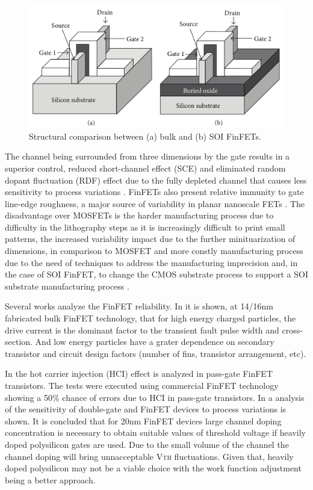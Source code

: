\documentclass[ecp,tc, english]{iiufrgs}
\begin{document}
\begin{figure}[H]
\centering
\includegraphics[width=\textwidth, trim={0 0cm 0 0cm},clip]{finfet2.png}
\caption{Structural comparison between (a) bulk and (b) SOI FinFETs.}
\label{bulkvssoi}
\end{figure}

The channel being surrounded from three dimensions by the gate results in a superior control, reduced short-channel effect (SCE) and eliminated random dopant fluctuation (RDF) effect due to the fully depleted channel that causes less sensitivity to process variations \cite{taur2013fundamentals}. FinFETs also present relative immunity to gate line-edge roughness, a major source of variability in planar nanoscale FETs \cite{finfetchar1}. The disadvantage over MOSFETs is the harder manufacturing process due to difficulty in the lithography steps as it is increasingly difficult to print small patterns, the increased variability impact due to the further minituarization of dimensions, in comparison to MOSFET and more constly manufacturing process due to the need of techniques to address the manufacturing imprecision and, in the case of SOI FinFET, to change the CMOS substrate process to support a SOI substrate manufacturing process \cite{finfetchar1} \cite{finfetdis}.

Several works analyze the FinFET reliability. In \cite{FinFET01} it is shown, at 14/16nm fabricated bulk FinFET technology, that for high energy charged particles, the drive current is the dominant factor to the transient fault pulse width and cross-section. And low energy particles have a grater dependence on secondary transistor and circuit design factors (number of fins, transistor arrangement, etc). 

In \cite{FinFET02} the hot carrier injection (HCI) effect is analyzed in pass-gate FinFET transistors. The tests were executed using commercial FinFET technology showing a 50\% chance of errors due to HCI in pass-gate transistors. In \cite{FinFET03} a analysis of the sensitivity of double-gate and FinFET devices to process variations is shown. It is concluded that for 20nm FinFET devices large channel doping concentration is necessary to obtain suitable values of threshold voltage if heavily doped polysilicon gates are used. Due to the small volume of the channel the channel doping will bring unnacceptable V\textsc{th} fluctuations. Given that, heavily doped polysilicon may not be a viable choice with the work function adjustment being a better approach. 
\end{document}
